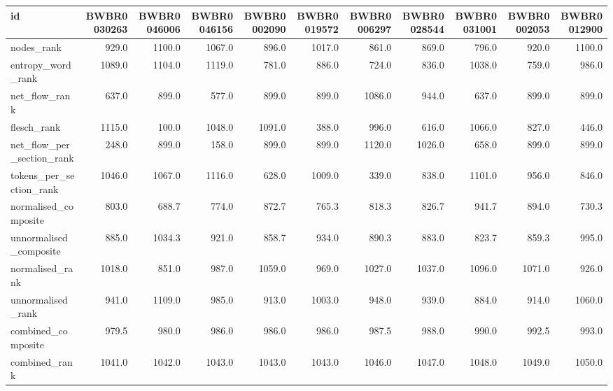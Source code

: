 \begin{tabular}{lrrrrrrrrrr}
\toprule
id & BWBR0030263 & BWBR0046006 & BWBR0046156 & BWBR0002090 & BWBR0019572 & BWBR0006297 & BWBR0028544 & BWBR0031001 & BWBR0002053 & BWBR0012900 \\
\midrule
nodes\_rank & 929.0 & 1100.0 & 1067.0 & 896.0 & 1017.0 & 861.0 & 869.0 & 796.0 & 920.0 & 1100.0 \\
\cline{1-11}
entropy\_word\_rank & 1089.0 & 1104.0 & 1119.0 & 781.0 & 886.0 & 724.0 & 836.0 & 1038.0 & 759.0 & 986.0 \\
\cline{1-11}
net\_flow\_rank & 637.0 & 899.0 & 577.0 & 899.0 & 899.0 & 1086.0 & 944.0 & 637.0 & 899.0 & 899.0 \\
\cline{1-11}
flesch\_rank & 1115.0 & 100.0 & 1048.0 & 1091.0 & 388.0 & 996.0 & 616.0 & 1066.0 & 827.0 & 446.0 \\
\cline{1-11}
net\_flow\_per\_section\_rank & 248.0 & 899.0 & 158.0 & 899.0 & 899.0 & 1120.0 & 1026.0 & 658.0 & 899.0 & 899.0 \\
\cline{1-11}
tokens\_per\_section\_rank & 1046.0 & 1067.0 & 1116.0 & 628.0 & 1009.0 & 339.0 & 838.0 & 1101.0 & 956.0 & 846.0 \\
\cline{1-11}
normalised\_composite & 803.0 & 688.7 & 774.0 & 872.7 & 765.3 & 818.3 & 826.7 & 941.7 & 894.0 & 730.3 \\
\cline{1-11}
unnormalised\_composite & 885.0 & 1034.3 & 921.0 & 858.7 & 934.0 & 890.3 & 883.0 & 823.7 & 859.3 & 995.0 \\
\cline{1-11}
normalised\_rank & 1018.0 & 851.0 & 987.0 & 1059.0 & 969.0 & 1027.0 & 1037.0 & 1096.0 & 1071.0 & 926.0 \\
\cline{1-11}
unnormalised\_rank & 941.0 & 1109.0 & 985.0 & 913.0 & 1003.0 & 948.0 & 939.0 & 884.0 & 914.0 & 1060.0 \\
\cline{1-11}
combined\_composite & 979.5 & 980.0 & 986.0 & 986.0 & 986.0 & 987.5 & 988.0 & 990.0 & 992.5 & 993.0 \\
\cline{1-11}
combined\_rank & 1041.0 & 1042.0 & 1043.0 & 1043.0 & 1043.0 & 1046.0 & 1047.0 & 1048.0 & 1049.0 & 1050.0 \\
\cline{1-11}
\bottomrule
\end{tabular}
